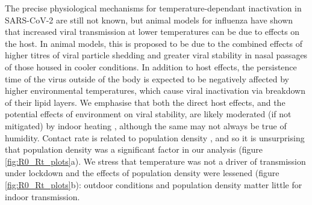 \documentclass[12pt,english,a4paper]{article}
\newcommand{\virus}{SARS-CoV-2\xspace}
\begin{document}
The precise physiological mechanisms for temperature-dependant inactivation in \virus are still not known, but animal models for influenza have shown that increased viral transmission at lower temperatures can be due to effects on the host\cite{Lowen2007, Lowen2014}. In animal models, this is proposed to be due to the combined effects of higher titres of viral particle shedding and greater viral stability in nasal passages of those housed in cooler conditions\cite{Lowen2014}. 
In addition to host effects, the persistence time of the virus outside of the body is expected to be negatively affected by higher environmental temperatures, which cause viral inactivation via breakdown of their lipid layers\citep{Chan2011,Schoeman2019}. 
We emphasise that both the direct host effects, and the potential effects of environment on viral stability, are likely moderated (if not mitigated) by indoor heating \citep{Shaman2010}, although the same may not always be true of humidity.
Contact rate is related to population density \citep{Rocklov2020}, and so it is unsurprising that population density was a significant factor in our analysis (figure \ref{fig:R0_Rt_plots}a).
We stress that temperature was not a driver of transmission under lockdown and the effects of population density were lessened (figure \ref{fig:R0_Rt_plots}b): outdoor conditions and population density matter little for indoor transmission.
\end{document}
